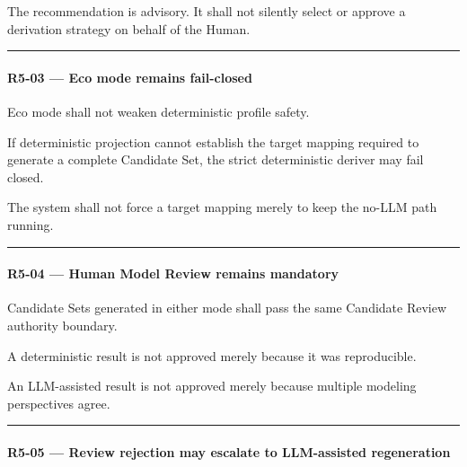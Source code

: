 The recommendation is advisory. It shall not silently select or approve a derivation strategy on behalf of the Human.

\begin{center}\rule{0.5\linewidth}{0.5pt}\end{center}

\hypertarget{r5-03--eco-mode-remains-fail-closed}{%
\paragraph{R5-03 --- Eco mode remains fail-closed}\label{r5-03--eco-mode-remains-fail-closed}}

Eco mode shall not weaken deterministic profile safety.

If deterministic projection cannot establish the target mapping required to generate a complete Candidate Set, the strict deterministic deriver may fail closed.

The system shall not force a target mapping merely to keep the no-LLM path running.

\begin{center}\rule{0.5\linewidth}{0.5pt}\end{center}

\hypertarget{r5-04--human-model-review-remains-mandatory}{%
\paragraph{R5-04 --- Human Model Review remains mandatory}\label{r5-04--human-model-review-remains-mandatory}}

Candidate Sets generated in either mode shall pass the same Candidate Review authority boundary.

A deterministic result is not approved merely because it was reproducible.

An LLM-assisted result is not approved merely because multiple modeling perspectives agree.

\begin{center}\rule{0.5\linewidth}{0.5pt}\end{center}

\hypertarget{r5-05--review-rejection-may-escalate-to-llm-assisted-regeneration}{%
\paragraph{R5-05 --- Review rejection may escalate to LLM-assisted regeneration}\label{r5-05--review-rejection-may-escalate-to-llm-assisted-regeneration}}

